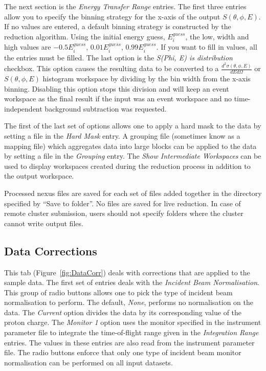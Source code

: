 The next section is the \textit{Energy Transfer Range} entries. The first three entries allow you to specify the binning strategy for the x-axis of the output $S(\theta, \phi, E)$. If no values are entered, a default binning strategy is constructed by the reduction algorithm. Using the initial energy guess, $E^{guess}_i$, the low, width and high values are $-0.5E^{guess}_i$, $0.01E^{guess}_i$, $0.99E^{guess}_i$. If you want to fill in values, all the entries must be filled. The last option is the \textit{S(Phi, E) is distribution} checkbox. This option causes the resulting data to be converted to a $\frac{d^2\sigma(\theta,\phi,E)}{dE d\Omega}$ or $S(\theta, \phi, E)$ histogram workspace by dividing by the bin width from the x-axis binning. Disabling this option stops this division and will keep an event workspace as the final result if the input was an event workspace and no time-independent background subtraction was requested. 

The first of the last set of options allows one to apply a hard mask to the data by setting a file in the \textit{Hard Mask} entry. A grouping file (sometimes know as a mapping file) which aggregates data into large blocks can be applied to the data by setting a file in the \textit{Grouping} entry. The \textit{Show Intermediate Workspaces} can be used to display workspaces created during the reduction process in addition to the output workspace. 

Processed nexus files are saved for each set of files added together in the directory specified by ``Save to folder''. No files are saved for live reduction. In case of remote cluster submission, users should not specify folders where the cluster cannot write output files.


\subsection{Data Corrections}
This tab (Figure~\ref{fig:DataCorr}) deals with corrections that are applied to the sample data. The first set of entries deals with the \textit{Incident Beam Normalisation}. This group of radio buttons allows one to pick the type of incident beam normalisation to perform. The default, \textit{None}, performs no normalisation on the data. The \textit{Current} option divides the data by its corresponding value of the proton charge. The \textit{Monitor 1} option uses the monitor specified in the instrument parameter file to integrate the time-of-flight range given in the \textit{Integration Range} entries. The values in these entries are also read from the instrument parameter file. The radio buttons enforce that only one type of incident beam monitor normalisation can be performed on all input datasets.

